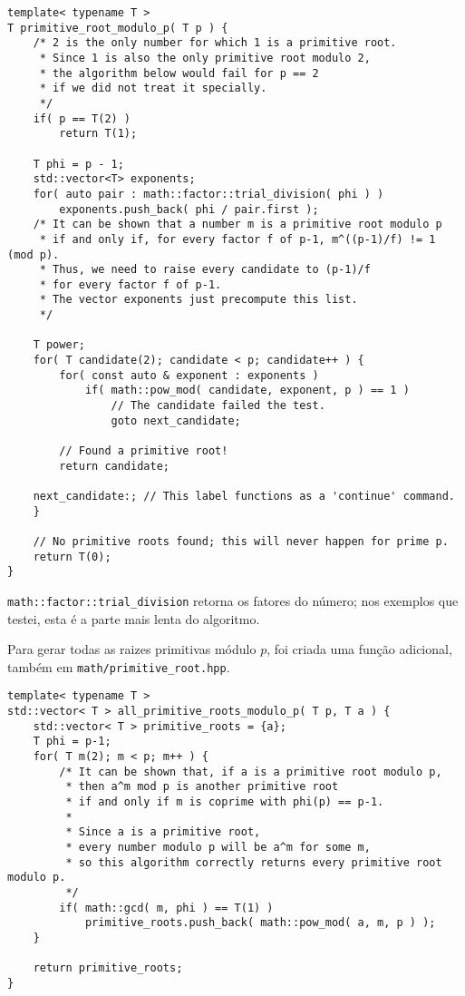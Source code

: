 \documentclass{article}
\theoremstyle{definition}
\begin{document}
\begin{verbatim}
template< typename T >
T primitive_root_modulo_p( T p ) {
    /* 2 is the only number for which 1 is a primitive root.
     * Since 1 is also the only primitive root modulo 2,
     * the algorithm below would fail for p == 2
     * if we did not treat it specially.
     */
    if( p == T(2) )
        return T(1);

    T phi = p - 1;
    std::vector<T> exponents;
    for( auto pair : math::factor::trial_division( phi ) )
        exponents.push_back( phi / pair.first );
    /* It can be shown that a number m is a primitive root modulo p
     * if and only if, for every factor f of p-1, m^((p-1)/f) != 1 (mod p).
     * Thus, we need to raise every candidate to (p-1)/f
     * for every factor f of p-1.
     * The vector exponents just precompute this list.
     */

    T power;
    for( T candidate(2); candidate < p; candidate++ ) {
        for( const auto & exponent : exponents )
            if( math::pow_mod( candidate, exponent, p ) == 1 )
                // The candidate failed the test.
                goto next_candidate;

        // Found a primitive root!
        return candidate;

    next_candidate:; // This label functions as a 'continue' command.
    }

    // No primitive roots found; this will never happen for prime p.
    return T(0);
}
\end{verbatim}

\verb"math::factor::trial_division" retorna os fatores do número;
nos exemplos que testei,
esta é a parte mais lenta do algoritmo.

Para gerar todas as raizes primitivas módulo $p$,
foi criada uma função adicional,
também em \verb"math/primitive_root.hpp".

\begin{verbatim}
template< typename T >
std::vector< T > all_primitive_roots_modulo_p( T p, T a ) {
    std::vector< T > primitive_roots = {a};
    T phi = p-1;
    for( T m(2); m < p; m++ ) {
        /* It can be shown that, if a is a primitive root modulo p,
         * then a^m mod p is another primitive root
         * if and only if m is coprime with phi(p) == p-1.
         *
         * Since a is a primitive root,
         * every number modulo p will be a^m for some m,
         * so this algorithm correctly returns every primitive root modulo p.
         */
        if( math::gcd( m, phi ) == T(1) )
            primitive_roots.push_back( math::pow_mod( a, m, p ) );
    }

    return primitive_roots;
}
\end{verbatim}
\end{document}
